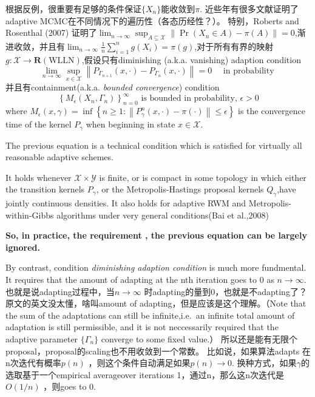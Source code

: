 \documentclass[
]{book}
\theoremstyle{definition}
\theoremstyle{definition}
\theoremstyle{definition}
\theoremstyle{remark}
\begin{document}
根据反例，很重要有足够的条件保证\(\{X_n\}\)能收敛到\(\pi\). 近些年有很多文献证明了adaptive MCMC在不同情况下的遍历性（各态历经性？）。
特别，Roberts and Rosenthal (2007) 证明了\(\lim _{n \rightarrow \infty} \sup _{A \subseteq \mathcal{X}} \| \operatorname{Pr}\left(X_{n} \in A\right)-\pi(A) \|=0\),渐进收敛，并且有\(\lim _{n \rightarrow \infty} \frac{1}{n} \sum_{i=1}^{n} g\left(X_{i}\right)=\pi(g)\),对于所有有界的映射\(g : \mathcal{X} \rightarrow \mathbf{R}(\mathrm{WLLN})\),假设只有diminishing (a.k.a. vanishing) adaption condition
\[
\lim _{n \rightarrow \infty} \sup _{x \in \mathcal{X}}\left\|P_{\Gamma_{n+1}}(x, \cdot)-P_{\Gamma_{n}}(x, \cdot)\right\|=0 \quad \text { in probability }
\]
并且有containment(a.k.a. \emph{bounded convergence}) condition
\[
\left\{M_{\epsilon}\left(X_{n}, \Gamma_{n}\right)\right\}_{n=0}^{\infty} \text { is bounded in probability, } \epsilon>0
\]
where \(M_{\epsilon}(x, \gamma)=\inf \left\{n \geq 1 :\left\|P_{\gamma}^{n}(x, \cdot)-\pi(\cdot)\right\| \leq \epsilon\right\}\) is the convergence time of the kernel \(P_\gamma\) when beginning in state \(x\in \mathcal X\).

The previous equation is a technical condition which is satisfied for virtually all reasonable adaptive schemes.

It holds whenever \(\mathcal X \times \mathcal Y\) is finite, or is compact in some topology in which either the transition kernels \(P_\gamma\), or the Metropolis-Hastings proposal kernels \(Q_\gamma\),have jointly continuous densities. It also holds for adaptive RWM and Metropolis-within-Gibbs algorithms under very general conditions(Bai et al.,2008)

\textbf{So, in practice, the requirement , the previous equation can be largely ignored. }

By contrast, condition \emph{diminishing adaption condition} is much more fundmental. It requires that the amount of adapting at the nth iteration goes to 0 as \(n\rightarrow \infty\).也就是说adapting过程中，当\(n\rightarrow \infty\) 时adapting的量到0，也就是不adapting了？原文的英文没太懂，啥叫amount of adapting，但是应该是这个理解。（Note that the sum of the adaptations can still be infinite,i.e.~an infinite total amount of adaptation is still permissible, and it is not neccessarily required that the adaptive parameter \(\{\Gamma_n\}\) converge to some fixed value.） 所以还是能有无限个proposal，proposal的scaling也不用收敛到一个常数。
比如说，如果算法adapts 在n次迭代有概率\(p(n)\) ，则这个条件自动满足如果\(p(n)\rightarrow 0.\) 换种方式，如果\(\gamma\)的选取基于一个empirical averageover iterations 1，通过n，那么这n次迭代是\(O(1/n)\) ，则goes to 0.
\end{document}
